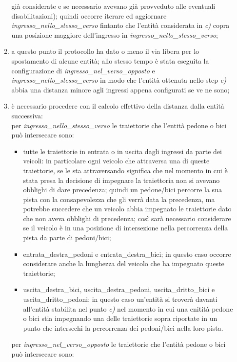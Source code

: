 \begin{enumerate}
\begin{enumerate}
già considerate e se necessario avevano già provveduto alle eventuali disabilitazioni); quindi occorre iterare ed aggiornare \textit{ingres\-so\_nel\-lo\_stes\-so\_ver\-so} fintanto che l'entità considerata in \textit{c)} copra una posizione maggiore dell'ingresso in \textit{ingres\-so\_nel\-lo\_stes\-so\_ver\-so};
\item a questo punto il protocollo ha dato o meno il via libera per lo spostamento di alcune entità; allo stesso tempo è stata eseguita la configurazione di \textit{ingres\-so\_nel\_ver\-so\_op\-pos\-to} e \textit{ingres\-so\_nel\-lo\_stes\-so\_ver\-so} in modo che l'entità ottenuta nello step \textit{c)} abbia una distanza minore agli ingressi appena configurati se ve ne sono;
\item è necessario procedere con il calcolo effettivo della distanza dalla entità successiva:\\
per \textit{ingres\-so\_nel\-lo\_stes\-so\_ver\-so} le traiettorie che l'entità pedone o bici può intersecare sono:
\begin{itemize}
\item tutte le traiettorie in entrata o in uscita dagli ingressi da parte dei veicoli: in particolare ogni veicolo che attraversa una di queste traiettorie, se le sta attraversando significa che nel momento in cui è stata presa la decisione di impegnare la traiettoria non si avevano obblighi di dare precedenza; quindi un pedone/bici percorre la sua pista con la consapevolezza che gli verrà data la precedenza, ma potrebbe succedere che un veicolo abbia impegnato le traiettorie dato che non aveva obblighi di precedenza; così sarà necessario considerare se il veicolo è in una posizione di intersezione nella percorrenza della pista da parte di pedoni/bici; 
\item en\-tra\-ta\_des\-tra\_pe\-do\-ni e en\-tra\-ta\_des\-tra\_bi\-ci; in questo caso occorre considerare anche la lunghezza del veicolo che ha impegnato queste traiettorie;
\item usci\-ta\_des\-tra\_bi\-ci, usci\-ta\_des\-tra\_pe\-do\-ni, usci\-ta\_drit\-to\_bi\-ci e usci\-ta\_drit\-to\_pe\-do\-ni; in questo caso un'entità si troverà davanti all'entità stabilita nel punto \textit{c)} nel momento in cui una enitità pedone o bici stia impegnando una delle traiettorie sopra riportate in un punto che intersechi la percorrenza dei pedoni/bici nella loro pista.
\end{itemize}
per \textit{ingres\-so\_nel\_ver\-so\_op\-pos\-to} le traiettorie che l'entità pedone o bici può intersecare sono:

\end{enumerate}
\end{enumerate}
